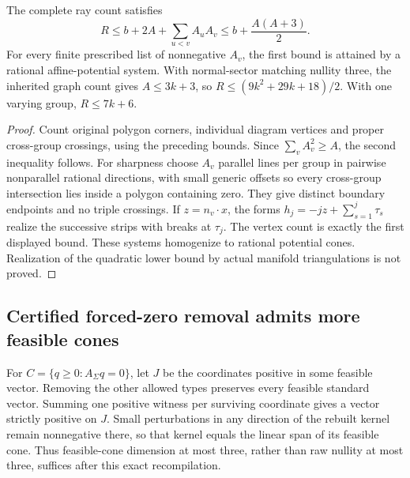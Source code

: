 \begin{proposition}
The complete ray count satisfies
\[
 R\le b+2A+\sum_{u<v}A_uA_v
       \le b+\frac{A(A+3)}2.
\]
For every finite prescribed list of nonnegative $A_v$, the first bound
is attained by a rational affine-potential system. With normal-sector
matching nullity three, the inherited graph count gives $A\le3k+3$,
so $R\le(9k^2+29k+18)/2$. With one varying group, $R\le7k+6$.
\end{proposition}
\begin{proof}
Count original polygon corners, individual diagram vertices and proper
cross-group crossings, using the preceding bounds. Since
$\sum_vA_v^2\ge A$, the second inequality follows.
For sharpness choose $A_v$ parallel lines per group in pairwise nonparallel
rational directions, with small generic offsets so every cross-group
intersection lies inside a polygon containing zero. They give distinct
boundary endpoints and no triple crossings. If $z=n_v\cdot x$, the forms
$h_j=-jz+\sum_{s=1}^j\tau_s$ realize the successive strips with breaks
at $\tau_j$. The vertex count is exactly the first displayed bound.
These systems homogenize to rational potential cones. Realization of the
quadratic lower bound by actual manifold triangulations is not proved.
\end{proof}

\subsection{Certified forced-zero removal admits more feasible cones}

For $C=\{q\ge0:A_\Sigma q=0\}$, let $J$ be the coordinates positive in
some feasible vector. Removing the other allowed types preserves every
feasible standard vector. Summing one positive witness per surviving
coordinate gives a vector strictly positive on $J$. Small perturbations in
any direction of the rebuilt kernel remain nonnegative there, so that
kernel equals the linear span of its feasible cone. Thus feasible-cone
dimension at most three, rather than raw nullity at most three, suffices
after this exact recompilation.

